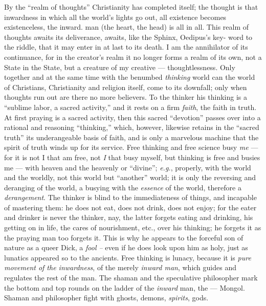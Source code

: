 By the ``realm of thoughts'' Christianity has completed itself; the thought 
is that inwardness in which all the world's lights go out, all existence 
becomes existenceless, the inward. man (the heart, the head) is all in all. 
This realm of thoughts awaits its deliverance, awaits, like the Sphinx, 
Oedipus's key- word to the riddle, that it may enter in at last to its death. 
I am the annihilator of its continuance, for in the creator's realm it no 
longer forms a realm of its own, not a State in the State, but a creature of 
my creative --- thoughtlessness. Only together and at the same time with the 
benumbed \textit{thinking} world can the world of Christians, Christianity and 
religion itself, come to its downfall; only when thoughts run out are there no 
more believers. To the thinker his thinking is a ``sublime labor, a sacred 
activity,'' and it rests on a firm \textit{faith}, the faith in truth. At 
first praying is a sacred activity, then this sacred ``devotion'' passes 
over into a rational and reasoning ``thinking,'' which, however, likewise 
retains in the ``sacred truth'' its underangeable basis of faith, and is 
only a marvelous machine that the spirit of truth winds up for its service. 
Free thinking and free science busy \textit{me} --- for it is not I that am 
free, not \textit{I} that busy myself, but thinking is free and busies me --- with heaven and the heavenly or ``divine''; \textit{e.g.}, properly, with 
the world and the worldly, not this world but ``another'' world; it is only 
the reversing and deranging of the world, a busying with the \textit{essence} 
of the world, therefore a \textit{derangement}. The thinker is blind to the 
immediateness of things, and incapable of mastering them: he does not eat, 
does not drink, does not enjoy; for the eater and drinker is never the 
thinker, nay, the latter forgets eating and drinking, his getting on in life, 
the cares of nourishment, etc., over his thinking; he forgets it as the 
praying man too forgets it. This is why he appears to the forceful son of 
nature as a queer Dick, a \textit{fool --} even if he does look upon him as 
holy, just as lunatics appeared so to the ancients. Free thinking is lunacy, 
because it is \textit{pure movement of the inwardness}, of the merely 
\textit{inward man}, which guides and regulates the rest of the man. The 
shaman and the speculative philosopher mark the bottom and top rounds on the 
ladder of the \textit{inward} man, the --- Mongol. Shaman and philosopher fight 
with ghosts, demons, \textit{spirits}, gods.

